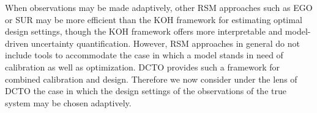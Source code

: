 \documentclass[12pt]{article}
\begin{document}
%
When observations may be made adaptively, other RSM approaches such as EGO \citep{Jones1998,Brochu2010} or SUR \citep{Geman1996,Villemonteix2009,Chevalier2014,Picheny2015,MiguelHernandez-Lobato2016,Picheny2019,Binois2019} may be more efficient than the KOH framework for estimating optimal design settings, though the KOH framework offers more interpretable and model-driven uncertainty quantification.
%
However, RSM approaches in general do not include tools to accommodate the case in which a model stands in need of calibration as well as optimization.
%
DCTO provides such a framework for combined calibration and design.
%
Therefore we now consider under the lens of DCTO the case in which the design settings of the observations of the true system may be chosen adaptively.
%

\end{document}
